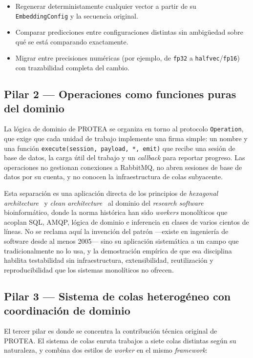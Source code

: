 \documentclass[11pt,a4paper]{article}
\begin{document}
\begin{itemize}[leftmargin=1.5em]
  \item Regenerar deterministamente cualquier vector a partir de su
    \texttt{EmbeddingConfig} y la secuencia original.
  \item Comparar predicciones entre configuraciones distintas sin ambigüedad
    sobre qué se está comparando exactamente.
  \item Migrar entre precisiones numéricas (por ejemplo, de \texttt{fp32} a
    \texttt{halfvec}/\texttt{fp16}) con trazabilidad completa del cambio.
\end{itemize}

\subsection{Pilar 2 — Operaciones como funciones puras del dominio}

La lógica de dominio de PROTEA se organiza en torno al protocolo
\texttt{Operation}, que exige que cada unidad de trabajo implemente una firma
simple: un nombre y una función \texttt{execute(session, payload, *, emit)}
que recibe una sesión de base de datos, la carga útil del trabajo y un
\emph{callback} para reportar progreso. Las operaciones no gestionan conexiones
a RabbitMQ, no abren sesiones de base de datos por su cuenta, y no conocen la
infraestructura de colas subyacente.

Esta separación es una aplicación directa de los principios de \emph{hexagonal
architecture}~\cite{cockburn2005hexagonal} y \emph{clean
architecture}~\cite{martin2017clean} al dominio del \emph{research software}
bioinformático, donde la norma histórica han sido \emph{workers} monolíticos
que acoplan SQL, AMQP, lógica de dominio e inferencia en clases de varios
cientos de líneas. No se reclama aquí la invención del patrón —existe en
ingeniería de software desde al menos 2005— sino su aplicación sistemática a
un campo que tradicionalmente no lo usa, y la demostración empírica de que
esa disciplina habilita testabilidad sin infraestructura, extensibilidad,
reutilización y reproducibilidad que los sistemas monolíticos no ofrecen.

\subsection{Pilar 3 — Sistema de colas heterogéneo con coordinación de dominio}

El tercer pilar es donde se concentra la contribución técnica original de
PROTEA. El sistema de colas enruta trabajos a siete colas distintas según su
naturaleza, y combina dos estilos de \emph{worker} en el mismo \emph{framework}:
\end{document}
